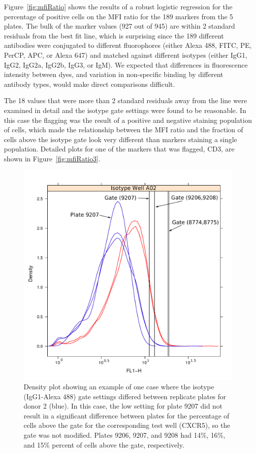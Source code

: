 \documentclass[12pt]{article}
\begin{document}
Figure~\ref{fig:mfiRatio} shows the results of a robust logistic regression for
the percentage of positive cells on the MFI ratio for the 189 markers
from the 5 plates. The bulk of the marker values (927 out of 945) are within 2
standard residuals from the best fit line, which is surprising since the 189
different antibodies were conjugated to different fluorophores (either Alexa
488, FITC, PE, PerCP, APC, or Alexa 647) and matched against different isotypes
(either IgG1, IgG2, IgG2a, IgG2b, IgG3, or IgM). We expected that differences
in fluorescence intensity between dyes, and variation in non-specific binding
by different antibody types, would make direct comparisons difficult. 

The 18 values that were more than 2 standard residuals away from the line were
examined in detail and the isotype gate settings were found to be reasonable. In
this case the flagging was the result of a positive and negative staining
population of cells, which made the relationship between the MFI ratio and the
fraction of cells above the isotype gate look very different than markers
staining a single population. Detailed plots for one of the markers that was
flagged, CD3, are shown in Figure~\ref{fig:mfiRatio3}. 

\begin{figure}
\centering
\includegraphics{isoplot.pdf}
\caption{Density plot showing an example of one case where the
isotype (IgG1-Alexa 488) gate settings differed between replicate plates for
donor 2 (blue). In this case, the low setting for plate 9207 did not result in a
significant difference between plates for the percentage of cells above the
gate for the corresponding test well (CXCR5), so the gate was not modified.
Plates 9206, 9207, and 9208 had 14\%, 16\%, and 15\% percent of cells above the
gate, respectively.}
\label{fig:isoPlot}
\end{figure}
\end{document}
